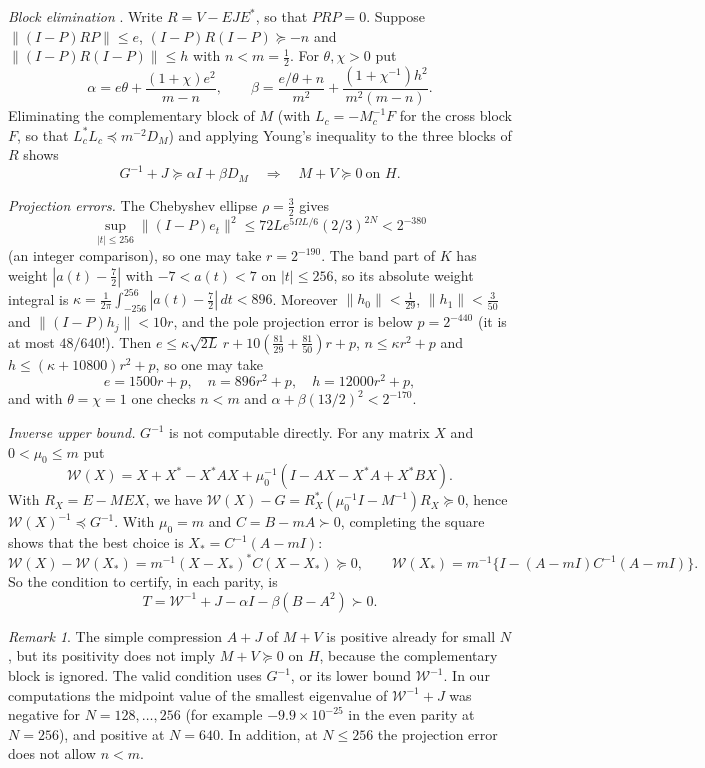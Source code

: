 \documentclass[11pt]{amsart}
\theoremstyle{remark}
\newtheorem{remark}[proposition]{Remark}
\numberwithin{equation}{section}
\begin{document}
\emph{Block elimination} \cite{Liu2026}. Write $R=V-EJE^*$, so that $P R P=0$. Suppose $\|(I-P)RP\|\le e$, $(I-P)R(I-P)\succeq-n$ and $\|(I-P)R(I-P)\|\le h$ with $n<m=\frac12$. For $\theta,\chi>0$ put
\[
\alpha=e\theta+\frac{(1+\chi)e^2}{m-n},\qquad
\beta=\frac{e/\theta+n}{m^2}+\frac{(1+\chi^{-1})h^2}{m^2(m-n)} .
\]
Eliminating the complementary block of $M$ (with $L_c=-M_c^{-1}F$ for the cross block $F$, so that $L_c^*L_c\preceq m^{-2}D_M$) and applying Young's inequality to the three blocks of $R$ shows
\begin{equation}\label{eq:finite}
G^{-1}+J\succeq\alpha I+\beta D_M\quad\Longrightarrow\quad M+V\succeq0\ \text{on }H .
\end{equation}

\emph{Projection errors.} The Chebyshev ellipse $\rho=\frac32$ gives
\[
\sup_{|t|\le256}\|(I-P)e_t\|^2\le72Le^{5\Omega L/6}(2/3)^{2N}<2^{-380}
\]
(an integer comparison), so one may take $r=2^{-190}$. The band part of $K$ has weight $|a(t)-\frac72|$ with $-7<a(t)<7$ on $|t|\le256$, so its absolute weight integral is $\kappa=\frac1{2\pi}\int_{-256}^{256}|a(t)-\frac72|\,dt<896$. Moreover $\|h_0\|<\frac1{29}$, $\|h_1\|<\frac3{50}$ and $\|(I-P)h_j\|<10r$, and the pole projection error is below $p=2^{-440}$ (it is at most $48/640!$). Then $e\le\kappa\sqrt{2L}\,r+10(\frac{81}{29}+\frac{81}{50})r+p$, $n\le\kappa r^2+p$ and $h\le(\kappa+10800)r^2+p$, so one may take
\[
e=1500r+p,\quad n=896r^2+p,\quad h=12000r^2+p,
\]
and with $\theta=\chi=1$ one checks $n<m$ and $\alpha+\beta(13/2)^2<2^{-170}$.

\emph{Inverse upper bound.} $G^{-1}$ is not computable directly. For any matrix $X$ and $0<\mu_0\le m$ put
\[
\mathcal W(X)=X+X^*-X^*AX+\mu_0^{-1}(I-AX-X^*A+X^*BX).
\]
With $R_X=E-MEX$, we have $\mathcal W(X)-G=R_X^*(\mu_0^{-1}I-M^{-1})R_X\succeq0$, hence $\mathcal W(X)^{-1}\preceq G^{-1}$. With $\mu_0=m$ and $C=B-mA\succ0$, completing the square shows that the best choice is $X_*=C^{-1}(A-mI)$:
\[
\mathcal W(X)-\mathcal W(X_*)=m^{-1}(X-X_*)^*C(X-X_*)\succeq0,\qquad
\mathcal W(X_*)=m^{-1}\{I-(A-mI)C^{-1}(A-mI)\}.
\]
So the condition to certify, in each parity, is
\begin{equation}\label{eq:T}
T=\mathcal W^{-1}+J-\alpha I-\beta(B-A^2)\succ0 .
\end{equation}

\begin{remark}
The simple compression $A+J$ of $M+V$ is positive already for small $N$, but its positivity does not imply $M+V\succeq0$ on $H$, because the complementary block is ignored. The valid condition uses $G^{-1}$, or its lower bound $\mathcal W^{-1}$. In our computations the midpoint value of the smallest eigenvalue of $\mathcal W^{-1}+J$ was negative for $N=128,\dots,256$ (for example $-9.9\times10^{-25}$ in the even parity at $N=256$), and positive at $N=640$. In addition, at $N\le256$ the projection error does not allow $n<m$.
\end{remark}
\end{document}
